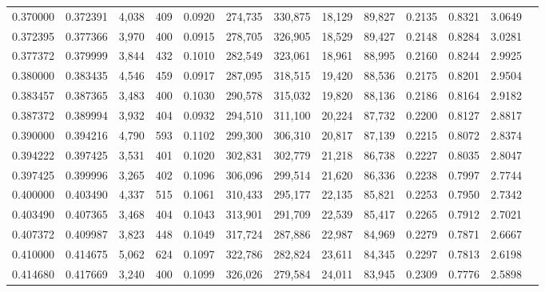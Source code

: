 \begin{tabular}{rrrrrrrrrrrrr}
0.370000 & 0.372391 &  4,038 &   409 &                                     0.0920 & 274,735 & 330,875 &  18,129 &  89,827 & 0.2135 & 0.8321 & 3.0649 \\
0.372395 & 0.377366 &  3,970 &   400 &                                     0.0915 & 278,705 & 326,905 &  18,529 &  89,427 & 0.2148 & 0.8284 & 3.0281 \\
0.377372 & 0.379999 &  3,844 &   432 &                                     0.1010 & 282,549 & 323,061 &  18,961 &  88,995 & 0.2160 & 0.8244 & 2.9925 \\
0.380000 & 0.383435 &  4,546 &   459 &                                     0.0917 & 287,095 & 318,515 &  19,420 &  88,536 & 0.2175 & 0.8201 & 2.9504 \\
0.383457 & 0.387365 &  3,483 &   400 &                                     0.1030 & 290,578 & 315,032 &  19,820 &  88,136 & 0.2186 & 0.8164 & 2.9182 \\
0.387372 & 0.389994 &  3,932 &   404 &                                     0.0932 & 294,510 & 311,100 &  20,224 &  87,732 & 0.2200 & 0.8127 & 2.8817 \\
0.390000 & 0.394216 &  4,790 &   593 &                                     0.1102 & 299,300 & 306,310 &  20,817 &  87,139 & 0.2215 & 0.8072 & 2.8374 \\
0.394222 & 0.397425 &  3,531 &   401 &                                     0.1020 & 302,831 & 302,779 &  21,218 &  86,738 & 0.2227 & 0.8035 & 2.8047 \\
0.397425 & 0.399996 &  3,265 &   402 &                                     0.1096 & 306,096 & 299,514 &  21,620 &  86,336 & 0.2238 & 0.7997 & 2.7744 \\
0.400000 & 0.403490 &  4,337 &   515 &                                     0.1061 & 310,433 & 295,177 &  22,135 &  85,821 & 0.2253 & 0.7950 & 2.7342 \\
0.403490 & 0.407365 &  3,468 &   404 &                                     0.1043 & 313,901 & 291,709 &  22,539 &  85,417 & 0.2265 & 0.7912 & 2.7021 \\
0.407372 & 0.409987 &  3,823 &   448 &                                     0.1049 & 317,724 & 287,886 &  22,987 &  84,969 & 0.2279 & 0.7871 & 2.6667 \\
0.410000 & 0.414675 &  5,062 &   624 &                                     0.1097 & 322,786 & 282,824 &  23,611 &  84,345 & 0.2297 & 0.7813 & 2.6198 \\
0.414680 & 0.417669 &  3,240 &   400 &                                     0.1099 & 326,026 & 279,584 &  24,011 &  83,945 & 0.2309 & 0.7776 & 2.5898 \\

\end{tabular}

